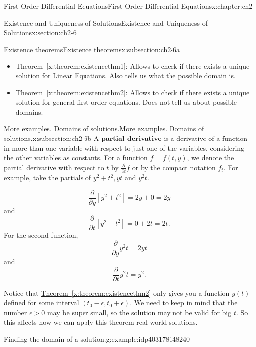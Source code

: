 \documentclass[oneside,10pt,]{book}
\newcommand{\xreffont}{\relax}
\newcommand{\terminology}[1]{\textbf{#1}}
\numberwithin{equation}{section}
\numberwithin{equation}{section}
\begin{document}
\begin{chapterptx}{First Order Differential Equations}{}{First Order Differential Equations}{}{}{x:chapter:ch2}
\begin{sectionptx}{Existence and Uniqueness of Solutions}{}{Existence and Uniqueness of Solutions}{}{}{x:section:ch2-6}
\begin{subsectionptx}{Existence theorems}{}{Existence theorems}{}{}{x:subsection:ch2-6a}
\begin{itemize}[label=\textbullet]
\item{}\hyperref[x:theorem:existencethm1]{Theorem~{\xreffont\ref{x:theorem:existencethm1}}}: Allows to check if there exists a unique solution for Linear Equations. Also tells us what the possible domain is.%
\item{}\hyperref[x:theorem:existencethm2]{Theorem~{\xreffont\ref{x:theorem:existencethm2}}}: Allows to check if there exists a unique solution for general first order equations. Does not tell us about possible domains.%
\end{itemize}
%
\end{subsectionptx}
%
%
\typeout{************************************************}
\typeout{************************************************}
%
\begin{subsectionptx}{More examples. Domains of solutions.}{}{More examples. Domains of solutions.}{}{}{x:subsection:ch2-6b}
A \terminology{partial derivative} is a derivative of a function in more than one variable with respect to just one of the variables, considering the other variables as constants. For a function \(f = f(t,y)\), we denote the partial derivative with respect to \(t\) by \(\frac{\partial}{\partial t} f\) or by the compact notation \(f_t\). For example, take the partials of \(y^{2}+t^{2},yt\) and \(y^{2}t\).%
\par
%
\begin{equation*}
\frac{\partial}{\partial y} [y^2 + t^2] = 2y + 0 = 2y
\end{equation*}
and%
\begin{equation*}
\frac{\partial}{\partial t} [y^2 + t^2] = 0 + 2t = 2t.
\end{equation*}
For the second function,%
\begin{equation*}
\frac{\partial}{\partial y} y^2 t = 2yt
\end{equation*}
and%
\begin{equation*}
\frac{\partial}{\partial t} y^2 t = y^2.
\end{equation*}
%
\par
Notice that \hyperref[x:theorem:existencethm2]{Theorem~{\xreffont\ref{x:theorem:existencethm2}}} only gives you a function \(y(t)\) defined for some interval \(\left(t_{0}-\epsilon,t_{0}+\epsilon\right)\). We need to keep in mind that the number \(\epsilon>0\) may be super small, so the solution may not be valid for big \(t\). So this affects how we can apply this theorem real world solutions.%
\begin{example}{Finding the domain of a solution.}{g:example:idp403178148240}%

\end{example}
\end{subsectionptx}
\end{sectionptx}
\end{chapterptx}
\end{document}
